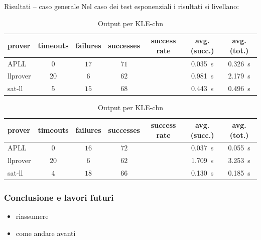\documentclass{beamer}
\begin{document}
\begin{frame}{Risultati -- caso generale}
	Nel caso dei test esponenziali i risultati si livellano:
	\begin{table}[h!]
		\begin{subtable}{\textwidth}
			\centering
			{\footnotesize
			\begin{tabular}{ | l c c c c c c | }
				\hline
				\textbf{prover} & \textbf{timeouts} & \textbf{failures} & \textbf{successes} & \textbf{success rate} & \textbf{avg. (succ.)} & \textbf{avg. (tot.)} \\
				\hline
				\hline
				APLL     & $0$  & $17$ & $71$ & \color{darkbluestatale}{$\approx 0.80$} & \qty{0.035}{\second} & \qty{0.326}{\second} \\
				llprover & $20$ & $6$  & $62$ & \color{darkbluestatale}{$\approx 0.70$} & \qty{0.981}{\second} & \qty{2.179}{\second} \\
				sat-ll   & $5$  & $15$ & $68$ & \color{darkbluestatale}{$\approx 0.77$} & \qty{0.443}{\second} & \qty{0.496}{\second} \\
				\hline
			\end{tabular}
			}
			\caption{Output per KLE-cbv}
			\label{table:KLE-cbv}
		\end{subtable}
		\begin{subtable}{\textwidth}
			\centering
			{\footnotesize
			\begin{tabular}{ | l c c c c c c | }
				\hline
				\textbf{prover} & \textbf{timeouts} & \textbf{failures} & \textbf{successes} & \textbf{success rate} & \textbf{avg. (succ.)} & \textbf{avg. (tot.)} \\
				\hline
				\hline
				APLL     & $0$  & $16$ & $72$ & \color{darkbluestatale}{$\approx 0.80$} & \qty{0.037}{\second} & \qty{0.055}{\second} \\
				llprover & $20$ & $6$  & $62$ & \color{darkbluestatale}{$\approx 0.70$} & \qty{1.709}{\second} & \qty{3.253}{\second} \\
				sat-ll   & $4$  & $18$ & $66$ & \color{darkbluestatale}{$\approx 0.75$} & \qty{0.130}{\second} & \qty{0.185}{\second} \\
				\hline
			\end{tabular}
			}
			\caption{Output per KLE-cbn}
			\label{table:KLE-cbn}
		\end{subtable}
	\end{table}
\end{frame}

\begin{frame}
  \frametitle{Conclusione e lavori futuri}
  \begin{itemize}
  \item riassumere
    
  \item come andare avanti
  \end{itemize}
\end{frame}

\backmatter[notitle]

\end{document}
